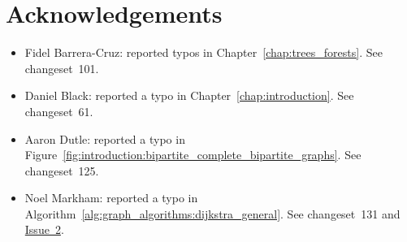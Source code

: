
\chapter{Acknowledgements}

\begin{itemize}
\item Fidel Barrera-Cruz: reported typos in
  Chapter~\ref{chap:trees_forests}. See changeset~101.

\item Daniel Black: reported a typo in
  Chapter~\ref{chap:introduction}. See changeset~61.

\item Aaron Dutle: reported a typo in
  Figure~\ref{fig:introduction:bipartite_complete_bipartite_graphs}. See
  changeset~125.

\item Noel Markham: reported a typo in
  Algorithm~\ref{alg:graph_algorithms:dijkstra_general}. See
  changeset~131 and
  \href{http://code.google.com/p/graph-theory-algorithms-book/issues/detail?id=2}{Issue~2}.
\end{itemize}
